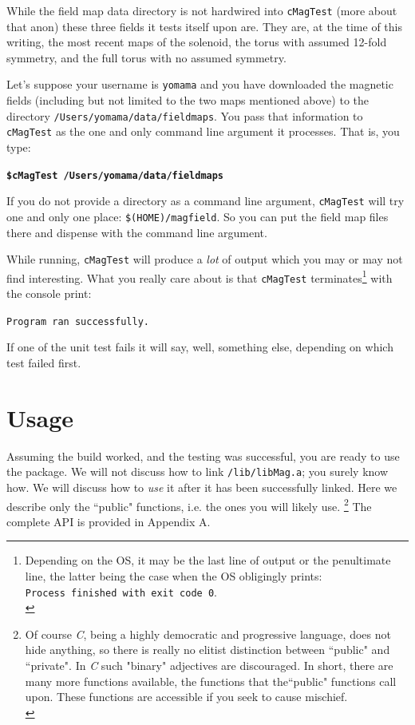 \documentclass{article}
\begin{document}
While the field map data directory is not hardwired into \texttt{cMagTest} (more about that anon) these three fields it tests itself upon are. They are, at the time of this writing, the most recent maps of the solenoid, the torus with assumed 12-fold symmetry, and the full torus with no assumed symmetry.

Let's suppose your username is \texttt{yomama} and you have downloaded the magnetic fields (including but not limited to the two maps mentioned above) to the directory \texttt{/Users/yomama/data/fieldmaps}. You pass that information to \texttt{cMagTest} as the one and only command line argument it processes. That is, you type:

\textbf{\texttt{\$cMagTest /Users/yomama/data/fieldmaps}}

If you do not provide a directory as a command line argument, \texttt{cMagTest} will try one and only one place: \texttt{\$(HOME)/magfield}. So you can put the field map files there and dispense with the command line argument.

While running, \texttt{cMagTest}  will produce a \textit{lot} of output which you may or may not find interesting.  What you really care about is that \texttt{cMagTest} terminates\footnote{Depending on the OS, it may be the last line of output or the penultimate line, the latter being the case when the OS obligingly prints:\\ \texttt{Process finished with exit code 0}.\\} with the console print: 

\texttt{Program ran successfully. }

If one of the unit test fails it will say, well, something else, depending on which test failed first.
\section {Usage}
Assuming the build worked, and the testing was successful, you are ready to use the package. We will not discuss how to link \texttt{/lib/libMag.a}; you surely know how. We will discuss how to \textit{use} it after it has been successfully  linked. Here we describe only the ``public" functions, i.e. the ones you will likely use. \footnote{Of course \textit{C}, being a highly democratic and progressive language, does not hide anything, so there is really no elitist distinction between ``public" and ``private".  In \textit{C} such "binary" adjectives are discouraged.  In short, there are many more functions available, the functions that the``public" functions call upon. These functions  are accessible if you seek to cause mischief.\\} The complete API is provided in Appendix A.
\end{document}
